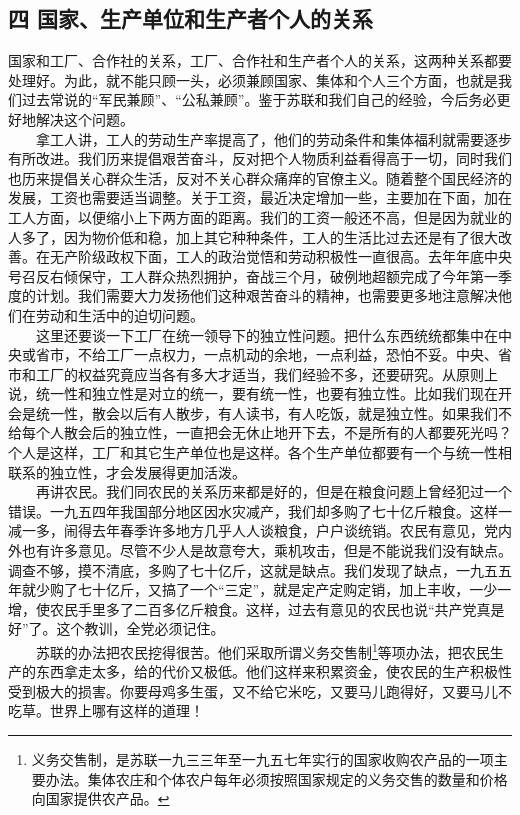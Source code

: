 \documentclass[cn,11pt,chinese]{elegantbook}
\def\myformat#1{\hfil\hfil #1}
\begin{document}
\subsection*{\myformat{四 国家、生产单位和生产者个人的关系}}
国家和工厂、合作社的关系，工厂、合作社和生产者个人的关系，这两种关系都要处理好。为此，就不能只顾一头，必须兼顾国家、集体和个人三个方面，也就是我们过去常说的“军民兼顾”、“公私兼顾”。鉴于苏联和我们自己的经验，今后务必更好地解决这个问题。\\
　　拿工人讲，工人的劳动生产率提高了，他们的劳动条件和集体福利就需要逐步有所改进。我们历来提倡艰苦奋斗，反对把个人物质利益看得高于一切，同时我们也历来提倡关心群众生活，反对不关心群众痛痒的官僚主义。随着整个国民经济的发展，工资也需要适当调整。关于工资，最近决定增加一些，主要加在下面，加在工人方面，以便缩小上下两方面的距离。我们的工资一般还不高，但是因为就业的人多了，因为物价低和稳，加上其它种种条件，工人的生活比过去还是有了很大改善。在无产阶级政权下面，工人的政治觉悟和劳动积极性一直很高。去年年底中央号召反右倾保守，工人群众热烈拥护，奋战三个月，破例地超额完成了今年第一季度的计划。我们需要大力发扬他们这种艰苦奋斗的精神，也需要更多地注意解决他们在劳动和生活中的迫切问题。\\
　　这里还要谈一下工厂在统一领导下的独立性问题。把什么东西统统都集中在中央或省市，不给工厂一点权力，一点机动的余地，一点利益，恐怕不妥。中央、省市和工厂的权益究竟应当各有多大才适当，我们经验不多，还要研究。从原则上说，统一性和独立性是对立的统一，要有统一性，也要有独立性。比如我们现在开会是统一性，散会以后有人散步，有人读书，有人吃饭，就是独立性。如果我们不给每个人散会后的独立性，一直把会无休止地开下去，不是所有的人都要死光吗？个人是这样，工厂和其它生产单位也是这样。各个生产单位都要有一个与统一性相联系的独立性，才会发展得更加活泼。\\
　　再讲农民。我们同农民的关系历来都是好的，但是在粮食问题上曾经犯过一个错误。一九五四年我国部分地区因水灾减产，我们却多购了七十亿斤粮食。这样一减一多，闹得去年春季许多地方几乎人人谈粮食，户户谈统销。农民有意见，党内外也有许多意见。尽管不少人是故意夸大，乘机攻击，但是不能说我们没有缺点。调查不够，摸不清底，多购了七十亿斤，这就是缺点。我们发现了缺点，一九五五年就少购了七十亿斤，又搞了一个“三定”，就是定产定购定销，加上丰收，一少一增，使农民手里多了二百多亿斤粮食。这样，过去有意见的农民也说“共产党真是好”了。这个教训，全党必须记住。\\
　　苏联的办法把农民挖得很苦。他们采取所谓义务交售制\footnote[1]{ 义务交售制，是苏联一九三三年至一九五七年实行的国家收购农产品的一项主要办法。集体农庄和个体农户每年必须按照国家规定的义务交售的数量和价格向国家提供农产品。}等项办法，把农民生产的东西拿走太多，给的代价又极低。他们这样来积累资金，使农民的生产积极性受到极大的损害。你要母鸡多生蛋，又不给它米吃，又要马儿跑得好，又要马儿不吃草。世界上哪有这样的道理！\\
\end{document}
